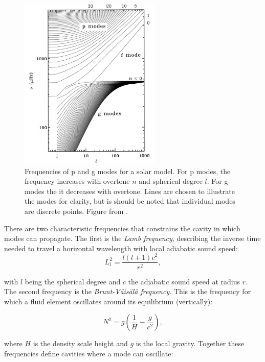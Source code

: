 \begin{figure}[t]
    \centering
    \includegraphics[width=0.6\textwidth]{pandgmodes.png}
    \caption{Frequencies of p and g modes for a solar model. For p modes, the frequency increases with overtone $n$ and spherical degree $l$. For g modes the it decreases with overtone. Lines are chosen to illustrate the modes for clarity, but is should be noted that individual modes are discrete points. Figure from \citet{aerts2010}. }
    \label{pandgmodes}
\end{figure}


There are two characteristic frequencies that constrains the cavity in which modes can propagate. The first is the \textit{Lamb frequency}, describing the inverse time needed to travel a horizontal wavelength with local adiabatic sound speed: 
\begin{equation}
    L_l^{2} = \frac{l(l+1)c^2}{r^2},
\end{equation}

\noindent with $l$ being the spherical degree and $c$ the adiabatic sound speed at radius $r$. The second frequency is the \textit{Brunt-Väisälä frequency}. This is the frequency for which a fluid element oscillates around its equilibrium (vertically): 

\begin{equation}
    N^2 = g\left(\frac{1}{H}-\frac{g}{c^2}\right),
\end{equation}

\noindent where $H$ is the density scale height and $g$ is the local gravity.
Together these frequencies define cavities where a mode can oscillate: 

